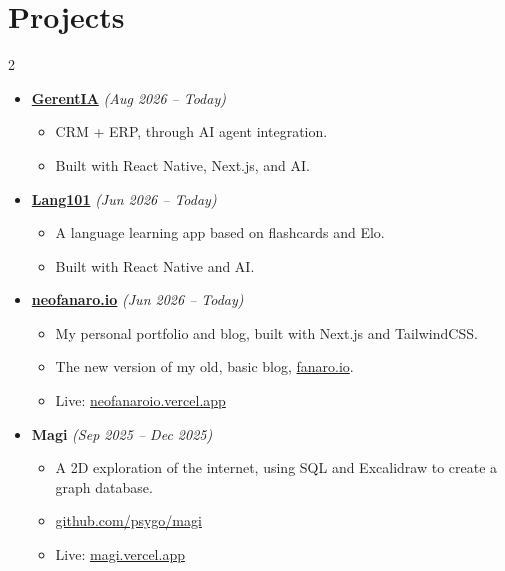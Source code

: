 \documentclass[12pt]{extarticle}
\renewcommand{\_}{\leavevmode\kern.06em\vbox{\hrule width.425em}}
\begin{document}
\section{Projects}

\vspace*{-0.3cm}

\begin{multicols}{2}
\begin{itemize}
  \item \textbf{\href{https://gerent.app}{GerentIA}
} \textit{(Aug 2026 -- Today)}
    \begin{itemize}
      \item CRM + ERP, through AI agent integration.
      \item Built with React Native, Next.js, and AI.
    \end{itemize}

  \item \textbf{\href{https://neofanaro.io/articles/lang101}{Lang101}
} \textit{(Jun 2026 -- Today)}
    \begin{itemize}
      \item A language learning app based on flashcards and Elo.
      \item Built with React Native and AI.
    \end{itemize}

  \item \textbf{\href{https://neofanaroio.io}{neofanaro.io}
} \textit{(Jun 2026 -- Today)}
    \begin{itemize}
      \item My personal portfolio and blog, built with Next.js and TailwindCSS.
      \item The new version of my old, basic blog, \href{https://github.com/psygo/fanaro.io}{fanaro.io}.
      \item Live: \href{https://neofanaroio.vercel.app}{neofanaroio.vercel.app}
    \end{itemize}

  \item \textbf{Magi} \textit{(Sep 2025 -- Dec 2025)}
    \begin{itemize}
      \item A 2D exploration of the internet, using SQL and Excalidraw to create a graph database.
      \item \href{https://github.com/psygo/magi}{github.com/psygo/magi}
      \item Live: \href{https://magi-phi.vercel.app/}{magi.vercel.app}
    \end{itemize}


\end{itemize}
\end{multicols}
\end{document}
